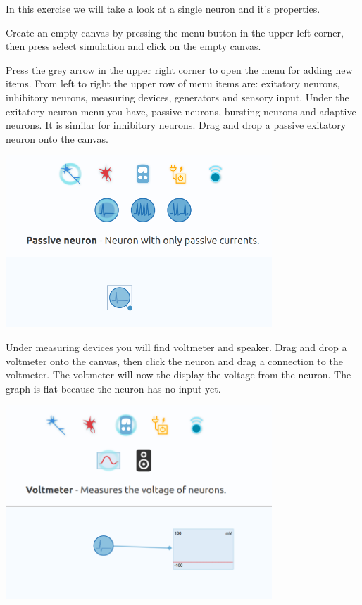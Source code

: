 \begin{Exercise}[title=Single neuron properties]
In this exercise we will take a look at a single neuron and it's properties.


Create an empty canvas by pressing the menu button in the upper left corner, then press select simulation and click on the empty canvas.

Press the grey arrow in the upper right corner to open the menu for adding new items. From left to right the upper row of menu items are: exitatory neurons, inhibitory neurons, measuring devices, generators and sensory input. 
Under the exitatory neuron menu you have, passive neurons, bursting neurons and adaptive neurons. It is similar for inhibitory neurons. Drag and drop a passive exitatory neuron onto the canvas. 

\begin{center}
\includegraphics[width=10cm]{single_neuron.png}
\end{center}



Under measuring devices you will find voltmeter and speaker. Drag and drop a voltmeter onto the canvas, then click the neuron and drag a connection to the voltmeter. The voltmeter will now the display the voltage from the neuron. The graph is flat because the neuron has no input yet.

\begin{center}
\includegraphics[width=10cm]{voltmeter.png}
\end{center}



\end{Exercise}
